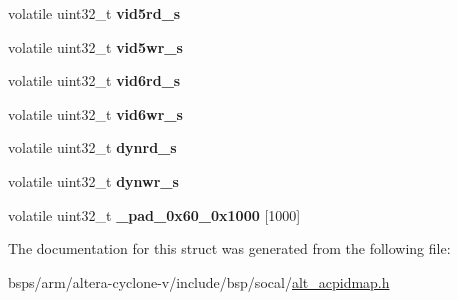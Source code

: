 \begin{DoxyCompactItemize}
volatile uint32\+\_\+t {\bfseries vid5rd\+\_\+s}
\item 
\mbox{\label{structALT__ACPIDMAP__raw__s_a61b27f315c7344df188d4b054b377c5b}} 
volatile uint32\+\_\+t {\bfseries vid5wr\+\_\+s}
\item 
\mbox{\label{structALT__ACPIDMAP__raw__s_ac2ef6b570110d4843f339462ad513ba6}} 
volatile uint32\+\_\+t {\bfseries vid6rd\+\_\+s}
\item 
\mbox{\label{structALT__ACPIDMAP__raw__s_a52db58a39dbf765e8dc1d446b00dbc57}} 
volatile uint32\+\_\+t {\bfseries vid6wr\+\_\+s}
\item 
\mbox{\label{structALT__ACPIDMAP__raw__s_a30cacbc60a3abd700a295c8295104161}} 
volatile uint32\+\_\+t {\bfseries dynrd\+\_\+s}
\item 
\mbox{\label{structALT__ACPIDMAP__raw__s_a3a2034dbe8a2982f9fce6947b4881d96}} 
volatile uint32\+\_\+t {\bfseries dynwr\+\_\+s}
\item 
\mbox{\label{structALT__ACPIDMAP__raw__s_a06a315035c87b1e55db142fef4ada146}} 
volatile uint32\+\_\+t {\bfseries \+\_\+pad\+\_\+0x60\+\_\+0x1000} \mbox{[}1000\mbox{]}
\end{DoxyCompactItemize}


The documentation for this struct was generated from the following file\+:\begin{DoxyCompactItemize}
\item 
bsps/arm/altera-\/cyclone-\/v/include/bsp/socal/\mbox{\hyperlink{alt__acpidmap_8h}{alt\+\_\+acpidmap.\+h}}\end{DoxyCompactItemize}
